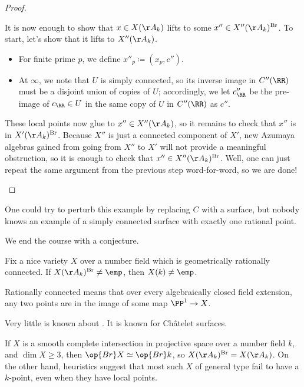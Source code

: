 \documentclass[../notes.tex]{subfiles}
\begin{document}
\begin{proof}
\begin{enumerate}[resume]
		It is now enough to show that $x\in X(\AA_k)$ lifts to some $x''\in X''(\AA_k)^{\mathrm{Br}}$. To start, let's show that it lifts to $X''(\AA_k)$.
		\begin{itemize}
			\item For finite prime $p$, we define $x''_p\coloneqq(x_p,c'')$.
			\item At $\infty$, we note that $U$ is simply connected, so its inverse image in $C''(\RR)$ must be a disjoint union of copies of $U$; accordingly, we let $c''_\RR$ be the pre-image of $c_\RR\in U$ in the same copy of $U$ in $C''(\RR)$ as $c''$.
		\end{itemize}
		These local points now glue to $x''\in X''(\AA_k)$, so it remains to check that $x''$ is in $X'(\AA_k)^{\mathrm{Br}}$. Because $X''$ is just a connected component of $X'$, new Azumaya algebras gained from going from $X''$ to $X'$ will not provide a meaningful obstruction, so it is enough to check that $x''\in X''(\AA_k)^{\mathrm{Br}}$. Well, one can just repeat the same argument from the previous step word-for-word, so we are done!
		\qedhere
	\end{enumerate}
\end{proof}
\begin{remark}
	One could try to perturb this example by replacing $C$ with a surface, but nobody knows an example of a simply connected surface with exactly one rational point.
\end{remark}
We end the course with a conjecture.
\begin{conj} \label{conj:br-enough}
	Fix a nice variety $X$ over a number field which is geometrically rationally connected. If $X(\AA_k)^{\mathrm{Br}}\ne\emp$, then $X(k)\ne\emp$.
\end{conj}
\begin{remark}
	Rationally connected means that over every algebraically closed field extension, any two points are in the image of some map $\PP^1 \to X$.
\end{remark}
\begin{remark}
	Very little is known about . It is known for Ch\^atelet surfaces.
\end{remark}
\begin{remark}
	If $X$ is a smooth complete intersection in projective space over a number field $k$, and $\dim X \ge 3$, then $\op{Br} X \simeq \op{Br} k$, so $X(\AA_k)^{\mathrm{Br}} = X(\AA_k)$. On the other hand, heuristics suggest that most such $X$ of general type fail to have a $k$-point, even when they have local points.
\end{remark}
\end{document}
